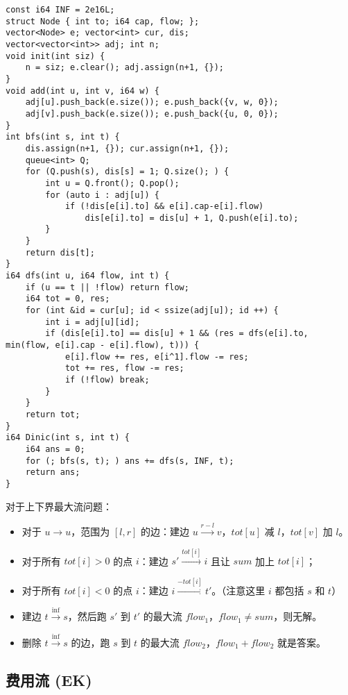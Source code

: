 \documentclass[a4paper,landscape,twocolumn]{ctexart}
\begin{document}
\begin{lstlisting}
const i64 INF = 2e16L;
struct Node { int to; i64 cap, flow; };
vector<Node> e; vector<int> cur, dis;
vector<vector<int>> adj; int n;
void init(int siz) {
	n = siz; e.clear(); adj.assign(n+1, {});
}
void add(int u, int v, i64 w) {
	adj[u].push_back(e.size()); e.push_back({v, w, 0});
	adj[v].push_back(e.size()); e.push_back({u, 0, 0});
}
int bfs(int s, int t) {
	dis.assign(n+1, {}); cur.assign(n+1, {});
	queue<int> Q;
	for (Q.push(s), dis[s] = 1; Q.size(); ) {
		int u = Q.front(); Q.pop();
		for (auto i : adj[u]) {
			if (!dis[e[i].to] && e[i].cap-e[i].flow)
				dis[e[i].to] = dis[u] + 1, Q.push(e[i].to);
		}
	}
	return dis[t];
}
i64 dfs(int u, i64 flow, int t) {
	if (u == t || !flow) return flow;
	i64 tot = 0, res;
	for (int &id = cur[u]; id < ssize(adj[u]); id ++) {
		int i = adj[u][id];
		if (dis[e[i].to] == dis[u] + 1 && (res = dfs(e[i].to, min(flow, e[i].cap - e[i].flow), t))) {
			e[i].flow += res, e[i^1].flow -= res;
			tot += res, flow -= res;
			if (!flow) break;
		}
	}
	return tot;
}
i64 Dinic(int s, int t) {
	i64 ans = 0;
	for (; bfs(s, t); ) ans += dfs(s, INF, t);
	return ans;
}
\end{lstlisting}

对于上下界最大流问题：

\begin{itemize}
\item 对于 $u \to u$，范围为 $[l, r]$ 的边：建边 $u \xrightarrow{r - l} v$，$tot[u]$ 减 $l$，$tot[v]$ 加 $l$。
\item 对于所有 $tot[i] > 0$ 的点 $i$：建边 $s' \xrightarrow{tot[i]} i$ 且让 $sum$ 加上 $tot[i]$；
\item 对于所有 $tot[i] < 0$ 的点 $i$：建边 $i \xrightarrow{-tot[i]} t'$。（注意这里 $i$ 都包括 $s$ 和 $t$）
\item 建边 $t \xrightarrow{\inf} s$，然后跑 $s'$ 到 $t'$ 的最大流 $flow_1$，$flow_1 \neq sum$，则无解。
\item 删除 $t \xrightarrow{\inf} s$ 的边，跑 $s$ 到 $t$ 的最大流 $flow_2$，$flow_1 + flow_2$ 就是答案。
\end{itemize}

\subsection{费用流 (EK)}
\end{document}
